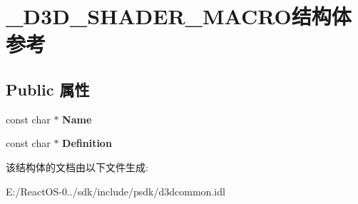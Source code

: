 \hypertarget{struct___d3_d___s_h_a_d_e_r___m_a_c_r_o}{}\section{\+\_\+\+D3\+D\+\_\+\+S\+H\+A\+D\+E\+R\+\_\+\+M\+A\+C\+R\+O结构体 参考}
\label{struct___d3_d___s_h_a_d_e_r___m_a_c_r_o}
\subsection*{Public 属性}
\begin{DoxyCompactItemize}
\item 
\mbox{\label{struct___d3_d___s_h_a_d_e_r___m_a_c_r_o_a16a06898c3437134ac89f52bc98edc3e}} 
const char $\ast$ {\bfseries Name}
\item 
\mbox{\label{struct___d3_d___s_h_a_d_e_r___m_a_c_r_o_aa875c5f01c63527985ad0f98500a8f33}} 
const char $\ast$ {\bfseries Definition}
\end{DoxyCompactItemize}


该结构体的文档由以下文件生成\+:\begin{DoxyCompactItemize}
\item 
E\+:/\+React\+O\+S-\/0../sdk/include/psdk/d3dcommon.\+idl\end{DoxyCompactItemize}
